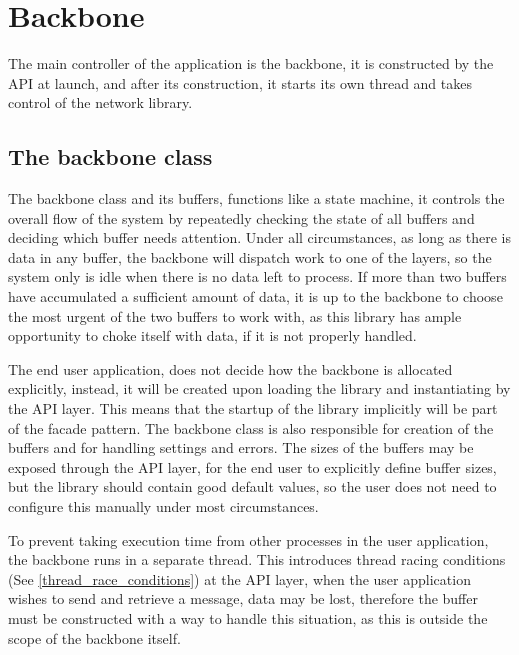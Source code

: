\chapter{Backbone}\label{chap:backbone}
The main controller of the application is the backbone, it is constructed by the API at launch, and after its construction, it starts its own thread and takes control of the network library.

\section{The backbone class}
The backbone class and its buffers, functions like a state machine, it controls the overall flow of the system by repeatedly checking the state of all buffers and deciding which buffer needs attention. Under all circumstances, as long as there is data in any buffer, the backbone will dispatch work to one of the layers, so the system only is idle when there is no data left to process.
If more than two buffers have accumulated a sufficient amount of data, it is up to the backbone to choose the most urgent of the two buffers to work with, as this library has ample opportunity to choke itself with data, if it is not properly handled.

The end user application, does not decide how the backbone is allocated explicitly, instead, it will be created upon loading the library and instantiating by the API layer. This means that the startup of the library implicitly will be part of the facade pattern.
The backbone class is also responsible for creation of the buffers and for handling settings and errors. The sizes of the buffers may be exposed through the API layer, for the end user to explicitly define buffer sizes, but the library should contain good default values, so the user does not need to configure this manually under most circumstances.

To prevent taking execution time from other processes in the user application, the backbone runs in a separate thread. This introduces thread racing conditions  (See \ref{thread_race_conditions}) at the API layer, when the user application wishes to send and retrieve a message, data may be lost, therefore the buffer must be constructed with a way to handle this situation, as this is outside the scope of the backbone itself.

